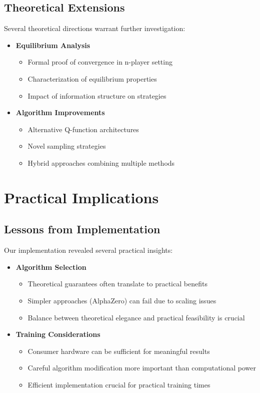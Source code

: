 \documentclass[11pt]{article}
\begin{document}
\subsection{Theoretical Extensions}
Several theoretical directions warrant further investigation:

\begin{itemize}
    \item \textbf{Equilibrium Analysis}
    \begin{itemize}
        \item Formal proof of convergence in n-player setting
        \item Characterization of equilibrium properties
        \item Impact of information structure on strategies
    \end{itemize}
    
    \item \textbf{Algorithm Improvements}
    \begin{itemize}
        \item Alternative Q-function architectures
        \item Novel sampling strategies
        \item Hybrid approaches combining multiple methods
    \end{itemize}
\end{itemize}

\section{Practical Implications}
\subsection{Lessons from Implementation}
Our implementation revealed several practical insights:

\begin{itemize}
    \item \textbf{Algorithm Selection}
    \begin{itemize}
        \item Theoretical guarantees often translate to practical benefits
        \item Simpler approaches (AlphaZero) can fail due to scaling issues
        \item Balance between theoretical elegance and practical feasibility is crucial
    \end{itemize}
    
    \item \textbf{Training Considerations}
    \begin{itemize}
        \item Consumer hardware can be sufficient for meaningful results
        \item Careful algorithm modification more important than computational power
        \item Efficient implementation crucial for practical training times
    \end{itemize}
\end{itemize}
\end{document}
